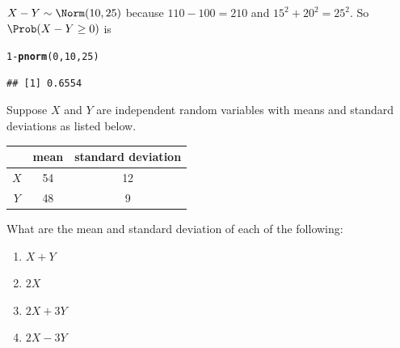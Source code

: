 \documentclass[twoside]{book}\usepackage[]{graphicx}\usepackage[]{xcolor}
\makeatletter
\newcommand{\hlnum}[1]{\textcolor[rgb]{0.686,0.059,0.569}{#1}}%
\newcommand{\hlopt}[1]{\textcolor[rgb]{0,0,0}{#1}}%
\newcommand{\hlstd}[1]{\textcolor[rgb]{0.345,0.345,0.345}{#1}}%
\newcommand{\hlkwd}[1]{\textcolor[rgb]{0.737,0.353,0.396}{\textbf{#1}}}%
\newenvironment{kframe}{%
 \def\at@end@of@kframe{}%
 \ifinner\ifhmode%
  \def\at@end@of@kframe{\end{minipage}}%
  \begin{minipage}{\columnwidth}%
 \fi\fi%
 \def\FrameCommand##1{\hskip\@totalleftmargin \hskip-\fboxsep
 \colorbox{shadecolor}{##1}\hskip-\fboxsep
     \hskip-\linewidth \hskip-\@totalleftmargin \hskip\columnwidth}%
 \MakeFramed {\advance\hsize-\width
   \@totalleftmargin\z@ \linewidth\hsize
   \@setminipage}}%
 {\par\unskip\endMakeFramed%
 \at@end@of@kframe}
\newenvironment{knitrout}{}{} %
\makeatother
\begin{document}
\begin{solution}
\begin{knitrout}
\end{knitrout}
$X - Y \sim \Norm(10, 25 )$ because $110 - 100 = 210$ and $15^2 + 20^2 = 25^2$.  
So $\Prob(X - Y \ge 0)$ is
\begin{knitrout}
\color{fgcolor}\begin{kframe}
\begin{alltt}
\hlnum{1} \hlopt{-} \hlkwd{pnorm}\hlstd{(}\hlnum{0}\hlstd{,} \hlnum{10}\hlstd{,} \hlnum{25}\hlstd{)}
\end{alltt}
\begin{verbatim}
## [1] 0.6554
\end{verbatim}
\end{kframe}
\end{knitrout}
\end{solution}

\begin{problem}
	Suppose $X$ and $Y$ are independent random variables with means
	and standard deviations as listed below.

	\begin{center}
		\begin{tabular}{ccc}
			\hline
			& mean & standard deviation\\
			\hline
			$X$ & 54 & 12 \\
			$Y$ & 48 & 9 \\
			\hline
		\end{tabular}
	\end{center}

	What are the mean and standard deviation of each of the following:

	\begin{enumerate}
		\item $X + Y$
		\item $2X$
		\item $2X + 3Y$
		\item $2X - 3Y$
	\end{enumerate}
\end{problem}
\end{document}
